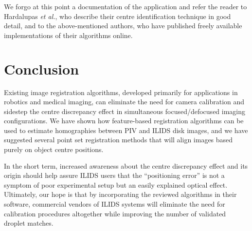 \documentclass[floatfix,aip,rsi,reprint,graphicx]{revtex4-1}
\begin{document}
We forgo at this point a documentation of the application and refer the reader to
Hardalupas \emph{et al.}, who describe their centre identification technique in
good detail, and to the above-mentioned authors, who have published freely
available implementations of their algorithms online.

\section{Conclusion}
Existing image registration algorithms, developed primarily for applications in
robotics and medical imaging, can eliminate the need for camera calibration and
sidestep the centre discrepancy effect in simultaneous focused/defocused imaging
configurations. We have shown how feature-based registration algorithms can be
used to estimate homographies between PIV and ILIDS disk images, and we have
suggested several point set registration methods that will align images based
purely on object centre positions.

In the short term, increased awareness about the centre discrepancy effect and
its origin should help assure ILIDS users that the ``positioning error'' is not a
symptom of poor experimental setup but an easily explained optical effect.
Ultimately, our hope is that by incorporating the reviewed algorithms in their
software, commercial vendors of ILIDS systems will eliminate the need for
calibration procedures altogether while improving the number of validated
droplet matches.


\end{document}
